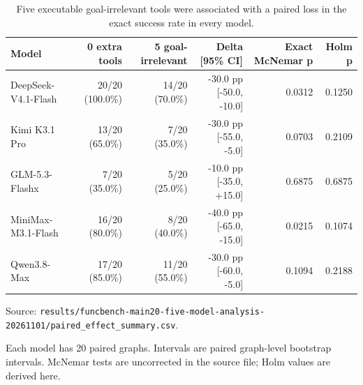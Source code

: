 \begin{table}[htbp]
\centering
\caption{Five executable goal-irrelevant tools were associated with a paired loss in the exact success rate in every model.}
\label{tab:main20}
\footnotesize
\setlength{\tabcolsep}{3pt}
\renewcommand{\arraystretch}{1.08}
\begin{tabularx}{\textwidth}{>{\raggedright\arraybackslash}Xrrrrr}
\toprule
Model & 0 extra tools & 5 goal-irrelevant & Delta [95\% CI] & Exact McNemar p & Holm p \\
\midrule
DeepSeek-V4.1-Flash & 20/20 (100.0\%) & 14/20 (70.0\%) & -30.0 pp [-50.0, -10.0] & 0.0312 & 0.1250 \\
Kimi K3.1 Pro & 13/20 (65.0\%) & 7/20 (35.0\%) & -30.0 pp [-55.0, -5.0] & 0.0703 & 0.2109 \\
GLM-5.3-Flashx & 7/20 (35.0\%) & 5/20 (25.0\%) & -10.0 pp [-35.0, +15.0] & 0.6875 & 0.6875 \\
MiniMax-M3.1-Flash & 16/20 (80.0\%) & 8/20 (40.0\%) & -40.0 pp [-65.0, -15.0] & 0.0215 & 0.1074 \\
Qwen3.8-Max & 17/20 (85.0\%) & 11/20 (55.0\%) & -30.0 pp [-60.0, -5.0] & 0.1094 & 0.2188 \\
\bottomrule
\end{tabularx}
\par\parbox{\linewidth}{\raggedright\footnotesize Source: \texttt{results/\allowbreak{}funcbench-main20-five-model-analysis-20261101/\allowbreak{}paired\_effect\_summary.csv}.}
\par\parbox{\linewidth}{\raggedright\footnotesize Each model has 20 paired graphs. Intervals are paired graph-level bootstrap intervals. McNemar tests are uncorrected in the source file; Holm values are derived here.}
\end{table}
